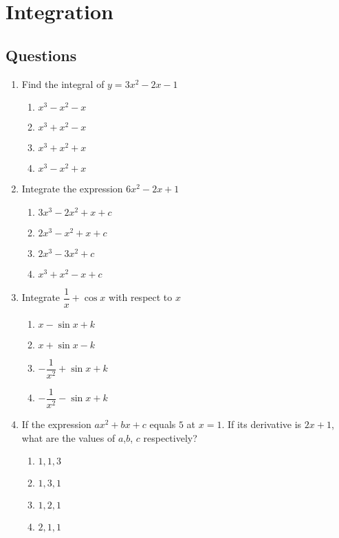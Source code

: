 \section{Integration}
\subsection{Questions}
\begin{multicols}{2}
\begin{enumerate}[label={\arabic*.}]
\item Find the integral of \(y = 3{x}^{2}-2x-1\)
	\begin{enumerate}[label={\Alph*.}]
	\item \({x}^{3} - {x}^{2} - x\)
	\item \({x}^{3} + {x}^{2} - x\)
	\item \({x}^{3} + {x}^{2} + x\)
	\item \({x}^{3} - {x}^{2} + x\)
	\end{enumerate}
\item Integrate the expression \(6{x}^{2} - 2x + 1\)
	\begin{enumerate}[label={\Alph*.}]
	\item \(3{x}^{3} - 2{x}^{2} + x + c\)
	\item \(2{x}^{3} - x^{2} + x + c\)
	\item \(2{x}^{3} - 3{x}^{2} + c\)
	\item \({x}^{3} + {x}^{2} - x + c\)
	\end{enumerate}
\item Integrate \(\dfrac{1}{x} + \cos {x}\) with respect to \(x\)
	\begin{enumerate}[label={\Alph*.}]
	\item \(x - \sin {x} + k\)
	\item \(x + \sin {x} - k\)
	\item \(-{\dfrac{1}{x^2}} + \sin {x} + k\)
	\item \(-{\dfrac{1}{x^2}} - \sin {x} + k\)
	\end{enumerate}
\item If the expression \(a{x}^{2} + bx + c\) equals \(5\) at \(x = 1\). If its derivative is \(2x + 1\), what are the values of \(a\),\(b\), \(c\) respectively?
	\begin{enumerate}[label={\Alph*.}]
	\item \(1, 1, 3\)
	\item \(1, 3, 1\)
	\item \(1, 2, 1\)
	\item \(2, 1, 1\)

\end{enumerate}
\end{enumerate}
\end{multicols}

